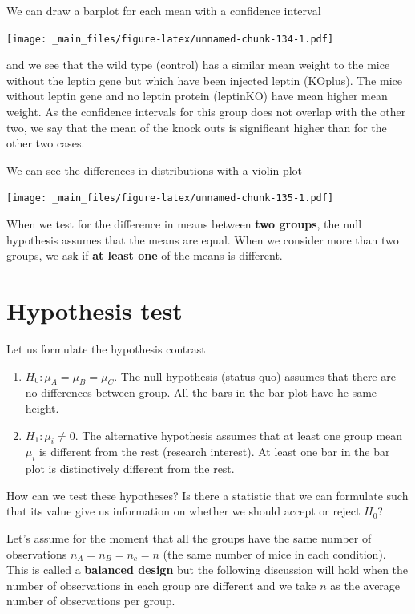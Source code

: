 \documentclass[
]{book}
\begin{document}
We can draw a barplot for each mean with a confidence interval

\texttt{[image: \_main\_files/figure-latex/unnamed-chunk-134-1.pdf]}

and we see that the wild type (control) has a similar mean weight to the mice without the leptin gene but which have been injected leptin (KOplus). The mice without leptin gene and no leptin protein (leptinKO) have mean higher mean weight. As the confidence intervals for this group does not overlap with the other two, we say that the mean of the knock outs is significant higher than for the other two cases.

We can see the differences in distributions with a violin plot

\texttt{[image: \_main\_files/figure-latex/unnamed-chunk-135-1.pdf]}

When we test for the difference in means between \textbf{two groups}, the null hypothesis assumes that the means are equal. When we consider more than two groups, we ask if \textbf{at least one} of the means is different.

\hypertarget{hypothesis-test-2}{%
\section{Hypothesis test}\label{hypothesis-test-2}}

Let us formulate the hypothesis contrast

\begin{enumerate}
\def\labelenumi{\alph{enumi}.}
\item
  \(H_0: \mu_A=\mu_B=\mu_C\). The null hypothesis (status quo) assumes that there are no differences between group. All the bars in the bar plot have he same height.
\item
  \(H_1: \mu_i\neq 0\). The alternative hypothesis assumes that at least one group mean \(\mu_i\) is different from the rest (research interest). At least one bar in the bar plot is distinctively different from the rest.
\end{enumerate}

How can we test these hypotheses? Is there a statistic that we can formulate such that its value give us information on whether we should accept or reject \(H_0\)?

Let's assume for the moment that all the groups have the same number of observations \(n_A=n_B=n_c=n\) (the same number of mice in each condition). This is called a \textbf{balanced design} but the following discussion will hold when the number of observations in each group are different and we take \(n\) as the average number of observations per group.
\end{document}
